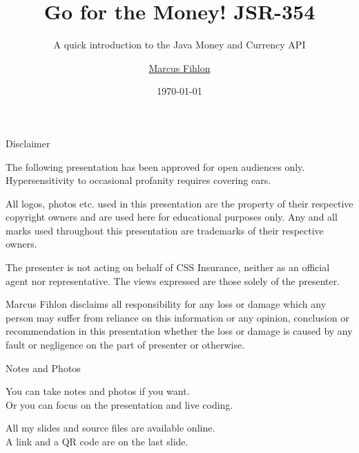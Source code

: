 \documentclass{beamer}
\title{Go for the Money! JSR-354}
\subtitle{A quick introduction to the Java Money and Currency API}
\author{\href{https://www.fihlon.ch/}{Marcus Fihlon}}
\institute[Fihlon]{\href{https://www.fihlon.ch/}{Scrum Master | Software Engineer | Lecturer | Speaker}}
\date{\today}
\newcommand{\slide}[2]{
	\begin{frame}{#1}
		#2
	\end{frame}
}
\begin{document}
\maketitle
\newlength\someheight

\slide{Disclaimer}{
	\begin{small}
		The following presentation has been approved for open audiences only. Hypersensitivity to occasional profanity requires covering ears.
		
		All logos, photos etc. used in this presentation are the property of their respective copyright owners and are used here for educational purposes only. Any and all marks used throughout this presentation are trademarks of their respective owners.
		
		The presenter is not acting on behalf of CSS Insurance, neither as an official agent nor representative. The views expressed are those solely of the presenter.
		
		Marcus Fihlon disclaims all responsibility for any loss or damage which any person may suffer from reliance on this information or any opinion, conclusion or recommendation in this presentation whether the loss or damage is caused by any fault or negligence on the part of presenter or otherwise.
	\end{small}
}

\slide{Notes and Photos}{
	\begin{center}
		You can take notes and photos if you want. \\
		Or you can focus on the presentation and live coding.
		
		All my slides and source files are available online. \\
		A link and a QR code are on the last slide.
	\end{center}
}
\end{document}
